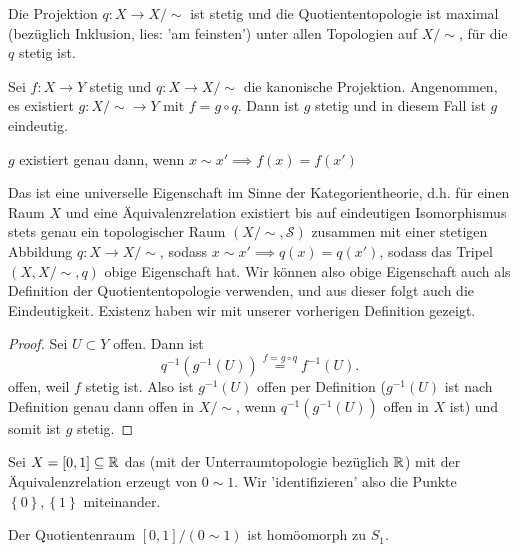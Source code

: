 \begin{remark}
    Die Projektion $q: X \to  X / \sim $ ist stetig und die Quotiententopologie ist maximal (bezüglich Inklusion, lies: 'am feinsten') unter allen Topologien auf $X / \sim $, für die $q$ stetig ist.
\end{remark}
\begin{theorem}\label{thm:universelle-eigenschaft-der-quotiententopologie}
    Sei $f : X \to  Y$ stetig und $q : X \to  X / \sim $ die kanonische Projektion. Angenommen, es existiert $g : X / \sim \to  Y$ mit $f = g \circ  q$. Dann ist $g$ stetig und in diesem Fall ist $g$ eindeutig. \\
    \begin{minipage}{\textwidth}
    \centering    
    \end{minipage}
\end{theorem}
\begin{remark}
    $g$ existiert genau dann, wenn  $x \sim x' \implies f(x) = f(x')$
\end{remark}
\begin{remark*}[Kategorientheorie]
    Das ist eine universelle Eigenschaft im Sinne der Kategorientheorie, d.h. für einen Raum $X$ und eine Äquivalenzrelation existiert bis auf eindeutigen Isomorphismus stets genau ein topologischer Raum $(X / \sim  , \mathcal{S})$ zusammen mit einer stetigen Abbildung $q : X \to  X / \sim $, sodass $x\sim x' \implies q(x) = q(x')$, sodass das Tripel $(X, X / \sim , q)$ obige Eigenschaft hat. Wir können also obige Eigenschaft auch als Definition der Quotiententopologie verwenden, und aus dieser folgt auch die Eindeutigkeit. Existenz haben wir mit unserer vorherigen Definition gezeigt.
\end{remark*}

\begin{proof}
    Sei $U\subset Y$ offen. Dann ist
    \[
        q^{-1}(g^{-1}(U)) \stackrel{f = g \circ  q}{=} f^{-1}(U)
    .\] 
    offen, weil $f$ stetig ist. Also ist  $g^{-1}(U)$ offen per Definition ($g^{-1}(U)$ ist nach Definition genau dann offen in $X / \sim $, wenn $q^{-1}(g^{-1}(U))$ offen in $X$ ist) und somit ist $g$ stetig. 
\end{proof}
\begin{example}
Sei $X = [0,1]\subseteq \mathbb{R}$ das  (mit der Unterraumtopologie bezüglich $\mathbb{R}$) mit der Äquivalenzrelation erzeugt von $0\sim 1$. Wir 'identifizieren' also die Punkte $\left \{0\right\} ,\left \{1\right\} $ miteinander.
\end{example}
\begin{theorem}[Kreishomöomorphie]\label{thm:kreis-ist-quotientenraum-von-einheitsintervall}
    Der Quotientenraum $[0,1] / (0\sim 1)$ ist homöomorph zu $S_1$.
\end{theorem}


